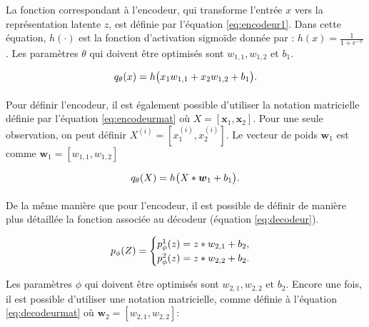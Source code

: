 La fonction correspondant à l'encodeur, qui transforme l'entrée $x$ vers la représentation latente $z$, est définie par l'équation \ref{eq:encodeur1}. Dans cette équation, $h(\cdot)$ est la fonction d'activation sigmoïde donnée par : $h(x)=\frac{1}{1+e^{-x}}$. Les paramètres $\theta$ qui doivent être optimisés sont $w_{1,1}, w_{1,2}$ et $b_1$. 

\begin{gather}  \label{eq:encodeur1}
q_{\theta}(x)=h\big(x_1w_{1,1} + x_2 w_{1,2} + b_1\big)\DIFaddbegin \DIFadd{.
}\DIFaddend \end{gather}

Pour définir l'encodeur, il est également possible d'utiliser la notation matricielle définie par l'équation \ref{eq:encodeurmat} où $X = [\boldsymbol x_1, \boldsymbol x_2]$. Pour une seule observation, on peut définir $X^{(i)} = [x_{1}^{(i)}, x_{2}^{(i)}]$. Le vecteur de poids $\boldsymbol w_1$ est \DIFdelbegin {}\DIFdelend \DIFaddbegin {}\DIFaddend comme $\boldsymbol w_1 = [w_{1,1}, w_{1,2}]$\DIFdelbegin {}\DIFdelend \DIFaddbegin \DIFadd{:
}\DIFaddend 

\begin{gather}  \label{eq:encodeurmat}
q_{\theta}(X)=h\big(X*\boldsymbol w_1 + b_1\big)\DIFaddbegin \DIFadd{.
}\DIFaddend \end{gather}

De la même manière que pour l'encodeur, il est possible de définir de manière plus détaillée la fonction associée au décodeur (équation \ref{eq:decodeur}).

\begin{gather}  \label{eq:decodeur}
p_{\phi}(Z)=
\DIFdelbegin %
\DIFdelend \DIFaddbegin \begin{cases}
p_{\phi}^1(z) = z*w_{2,1}+b_2, \\
p_{\phi}^2(z) = z*w_{2,2}+b_2.
\end{cases}
\DIFaddend \end{gather}

Les paramètres $\phi$ qui doivent être optimisés sont $w_{2,1}, w_{2,2}$ et $b_2$. Encore une fois, il est possible d'utiliser une notation matricielle, comme définie à l'équation \ref{eq:decodeurmat} où $\boldsymbol w_2 = [w_{2,1}, w_{2,2}]$:

